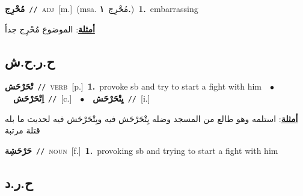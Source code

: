 \documentclass[10pt,a4paper,twoside]{article} %
\begin{document}
\begin{multicols}{2}
{\setlength\topsep{0pt}\textbf{\foreignlanguage{arabic}{مُحْرِج}}\ {\color{gray}\texttt{//}\color{black}}\ \textsc{adj}\ [m.]\ \color{gray}(msa. \foreignlanguage{arabic}{مُحْرِج}~\foreignlanguage{arabic}{\textbf{١.}})\color{black}\ \textbf{1.}~embarrassing\  \begin{flushright}\color{gray}\foreignlanguage{arabic}{\textbf{\underline{\foreignlanguage{arabic}{أمثلة}}}: الموضوع مُحْرِج جداً}\end{flushright}\color{black}} \vspace{2mm}

\vspace{-3mm}
\subsection*{\color{blue}\foreignlanguage{arabic}{ح.ر.ح.ش}\color{blue}{}} 

{\setlength\topsep{0pt}\textbf{\foreignlanguage{arabic}{تْحَرْحَش}}\ {\color{gray}\texttt{//}\color{black}}\ \textsc{verb}\ [p.]\ \textbf{1.}~provoke sb and try to start a fight with him\ \ $\bullet$\ \ \setlength\topsep{0pt}\textbf{\foreignlanguage{arabic}{اِتْحَرْحَش}}\ {\color{gray}\texttt{//}\color{black}}\ [c.]\ \ $\bullet$\ \ \setlength\topsep{0pt}\textbf{\foreignlanguage{arabic}{يِتْحَرْحَش}}\ {\color{gray}\texttt{//}\color{black}}\ [i.]\  \begin{flushright}\color{gray}\foreignlanguage{arabic}{\textbf{\underline{\foreignlanguage{arabic}{أمثلة}}}: استلمه وهو طالع من المسجد وضله يِتْحَرْحَش فيه ويِتْحَرْحَش فيه لحديت ما بله قتلة مرتبة}\end{flushright}\color{black}} \vspace{2mm}

{\setlength\topsep{0pt}\textbf{\foreignlanguage{arabic}{حَرْحَشِة}}\ {\color{gray}\texttt{//}\color{black}}\ \textsc{noun}\ [f.]\ \textbf{1.}~provoking sb and trying to start a fight with him\ } \vspace{2mm}

\vspace{-3mm}
\subsection*{\color{blue}\foreignlanguage{arabic}{ح.ر.د}\color{blue}{}} 


\end{multicols}
\end{document}
